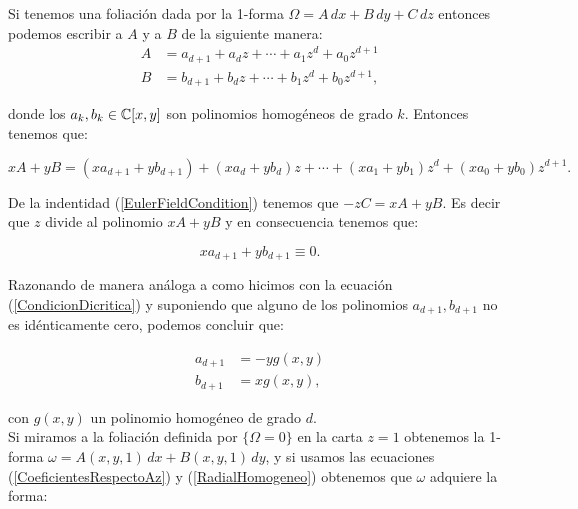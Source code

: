 Si tenemos una foliación dada por la 1-forma $\Omega=A\, dx+B\, dy+C\, dz$ entonces podemos escribir a $A$ y a $B$ de la siguiente manera:
\begin{equation}
\label{CoeficientesRespectoAz}
\begin{aligned}
A &=a_{d+1}+a_{d}z+\cdots+a_{1}z^{d}+a_{0}z^{d+1}\\
B &=b_{d+1}+b_{d}z+\cdots+b_{1}z^{d}+b_{0}z^{d+1},
\end{aligned}
\end{equation}

\noindent donde los $a_{k},b_{k}\in\mathbb{C}[x,y]$ son polinomios homogéneos de grado $k$. Entonces tenemos que:

\begin{equation}
xA+yB = (xa_{d+1}+yb_{d+1})+(xa_{d}+yb_{d})z+\cdots+(xa_{1}+yb_{1})z^{d}+(xa_{0}+yb_{0})z^{d+1}.
\end{equation}

\noindent De la indentidad (\ref{EulerFieldCondition}) tenemos que $-zC=xA+yB$. Es decir que $z$ divide al polinomio $xA+yB$ y en consecuencia tenemos que:

\begin{equation}
\label{CondicionImportante}
 xa_{d+1}+yb_{d+1}\equiv 0.
\end{equation}

\noindent Razonando de manera análoga a como hicimos con la ecuación (\ref{CondicionDicritica}) y suponiendo que alguno de los polinomios $a_{d+1},b_{d+1}$ no es idénticamente cero, podemos concluir que:

\begin{equation} 
\begin{aligned}
\label{RadialHomogeneo}
a_{d+1} &= -yg(x,y)\\
b_{d+1} &= xg(x,y),
\end{aligned}
\end{equation}

\noindent con $g(x,y)$ un polinomio homogéneo de grado $d$.\\ %


Si miramos a la foliación definida por $\{ \Omega=0 \}$ en la carta $z=1$ obtenemos la 1-forma $\omega=A(x,y,1)\, dx+B(x,y,1)\, dy$, y si usamos las ecuaciones (\ref{CoeficientesRespectoAz}) y (\ref{RadialHomogeneo}) obtenemos que $\omega$ adquiere la forma:

